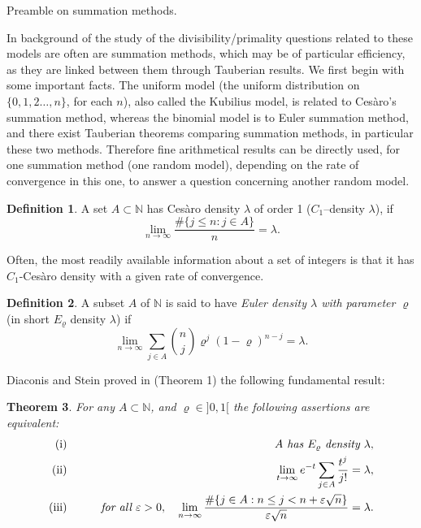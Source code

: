\documentclass[11pt,draft,reqno]{amsart}
\makeatletter
\def\section{\@startsection{section}{1}%
     \z@{.7\linespacing\@plus\linespacing}{.5\linespacing}%
     {\bfseries%
     \centering
     }}
\newtheorem{theorem}{Theorem}[section]
\theoremstyle{definition}
\newtheorem{definition}[theorem]{Definition}
\theoremstyle{remarks}
\numberwithin{equation}{section}
\def \e{{\varepsilon}}
\def \l{{\lambda}}
\def \qq{{\qquad}}
\def\N{{\mathbb N}}
\makeatother
\begin{document}
\bigskip\par
\section{Preamble on summation methods.}\label{s2}




In background  of  the study of the divisibility/primality questions   related to these models are often are summation methods, which may be  of   particular efficiency, as they are linked between them through   Tauberian results. We first begin with some important facts. The uniform  model  (the uniform distribution on $\{0,1,2\ldots, n\}$, for each $n$), also called the   Kubilius model,  is related to Ces\`aro's summation method, whereas the binomial model is  to Euler
  summation method, and there exist Tauberian theorems 
  comparing   summation  methods, in particular these two methods.  Therefore   fine arithmetical results can be   directly used, for one summation  method (one random model), depending on the rate of convergence in this one, to answer a question concerning another random model.  
\begin{definition} A  set  
$A\subset 
\N$   has  Ces\`aro density $\l$ of order 1 ($C_1$--density $\l$),  if 
$$\lim_{n\to \infty}\frac{\#\{ j\le n: j\in A\}}{n}= \l.
$$
\end{definition}Often, the most readily available information about a set  of integers is that it has $C_1$-Ces\`aro density with a given rate of convergence. \begin{definition}  A subset $A$ of $  \N$ is said to have {\it Euler density  $\l$ 
with parameter
$\varrho $} (in short ${ E}_\varrho$ density $\l$) if 
\begin{equation*} 
\lim_{n\to \infty}\sum_{j\in A} {{n}\choose{j}} \varrho^j (1-\varrho)^{n-j}= \l.
\end{equation*} 
\end{definition}
Diaconis and Stein proved in \cite{DS}
(Theorem 1) the following fundamental result:
\begin{theorem}\label{ds}For any $A\subset \N$, and $\varrho\in ]0,1[$ the following assertions are equivalent:
 \begin{eqnarray*} \label{dschar} ({\rm i})  & &\qq \hbox{\it $A$ has  ${E}_\varrho$ density $\l$},
  \cr   ({\rm ii})  & &\qq\lim_{t\to \infty} e^{-t}\sum_{j\in A} \frac{t^j}{j!}=\l,
 \cr ({\rm iii})  & &\qq \hbox{\it  for all $\e>0$}, \quad    \lim_{n\to \infty} \frac{\#\{j\in A : n\le j< n+\e\sqrt n\} }{\e\sqrt n} 
 =\l . 
 \end{eqnarray*}
\end{theorem} 
 
\end{document}
